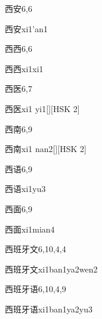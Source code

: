 \begin{entry}{西安}{6,6}
  \begin{phonetics}{西安}{xi1'an1}
  \end{phonetics}
\end{entry}

\begin{entry}{西西}{6,6}
  \begin{phonetics}{西西}{xi1xi1}
  \end{phonetics}
\end{entry}

\begin{entry}{西医}{6,7}
  \begin{phonetics}{西医}{xi1 yi1}[][HSK 2]
  \end{phonetics}
\end{entry}

\begin{entry}{西南}{6,9}
  \begin{phonetics}{西南}{xi1 nan2}[][HSK 2]
  \end{phonetics}
\end{entry}

\begin{entry}{西语}{6,9}
  \begin{phonetics}{西语}{xi1yu3}
  \end{phonetics}
\end{entry}

\begin{entry}{西面}{6,9}
  \begin{phonetics}{西面}{xi1mian4}
  \end{phonetics}
\end{entry}

\begin{entry}{西班牙文}{6,10,4,4}
  \begin{phonetics}{西班牙文}{xi1ban1ya2wen2}
  \end{phonetics}
\end{entry}

\begin{entry}{西班牙语}{6,10,4,9}
  \begin{phonetics}{西班牙语}{xi1ban1ya2yu3}
  \end{phonetics}
\end{entry}

